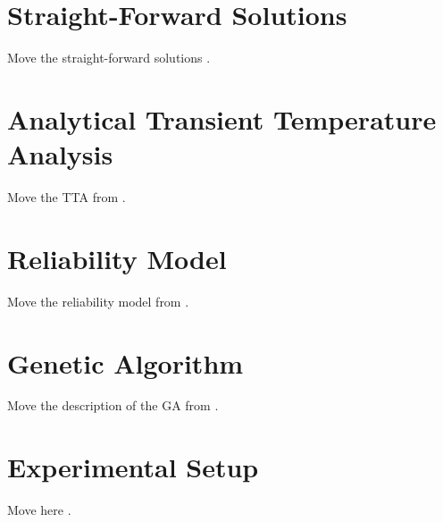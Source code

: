 \documentclass{sig-alternate}
\begin{document}
  \appendix

  \section{Straight-Forward Solutions}
  Move the straight-forward solutions .

  \section{Analytical Transient Temperature Analysis}
  Move the TTA from .

  \section{Reliability Model}
  Move the reliability model from .

  \section{Genetic Algorithm}
  Move the description of the GA from .

  \section{Experimental Setup}
  Move here .
\end{document}
